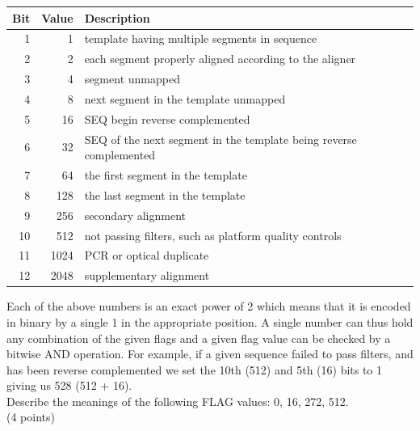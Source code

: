 \documentclass[11pt]{article}
\begin{document}
\begin{enumerate}
  {\small
  \begin{tabular}{rrl}
    Bit & Value & Description\\
    \hline
    1 & 1 & template having multiple segments in sequence \\
    2 & 2 & each segment properly aligned according to the aligner\\
    3 & 4 & segment unmapped\\
    4 & 8 & next segment in the template unmapped\\
    5 & 16 & SEQ begin reverse complemented\\
    6 & 32 & SEQ of the next segment in the template being reverse complemented\\
    7 & 64 & the first segment in the template\\
    8 & 128 & the last segment in the template\\
    9 & 256 & secondary alignment\\
    10 & 512 & not passing filters, such as platform quality controls\\
    11 & 1024 & PCR or optical duplicate\\
    12 & 2048 & supplementary alignment\\
  \end{tabular}
  }

  Each of the above numbers is an exact power of 2 which means that it is
  encoded in binary by a single 1 in the appropriate position. A single
  number can thus hold any combination of the given flags and
  a given flag value can be checked by a bitwise AND operation. For example,
  if a given sequence failed to pass filters, and has been reverse
  complemented we set the 10th (512) and 5th (16) bits to 1 giving us 528 (512 +
  16).\\
  Describe the meanings of the following FLAG values: 0, 16, 272, 512.\\
  (4 points)
\end{enumerate}
\end{document}
